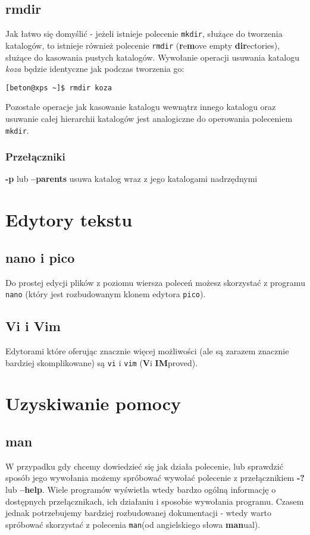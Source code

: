 \documentclass[10 pt, a4paper, draft]{report}
\begin{document}
\subsection{rmdir}
Jak łatwo się domyślić - jeżeli istnieje polecenie \texttt{mkdir}, służące do tworzenia katalogów, to istnieje również polecenie \texttt{rmdir} (\textbf{r}e\textbf{m}ove empty \textbf{dir}ectories), służące do kasowania pustych katalogów. Wywołanie operacji usuwania katalogu \textit{koza} będzie identyczne jak podczas tworzenia go:
\begin{verbatim}
[beton@xps ~]$ rmdir koza
\end{verbatim}
Pozostałe operacje jak kasowanie katalogu wewnątrz innego katalogu oraz usuwanie całej hierarchii katalogów jest analogiczne do operowania poleceniem \texttt{mkdir}.
\newline
\subsubsection*{Przełączniki}
\begin{description}
\item \textbf{-p} lub \textbf{--parents} usuwa katalog wraz z jego katalogami nadrzędnymi
\end{description}

\section{Edytory tekstu}
\subsection{nano i pico}
Do prostej edycji plików z poziomu wiersza poleceń możesz skorzystać z programu \texttt{nano} (który jest rozbudowanym klonem edytora \texttt{pico}).
\subsection{Vi i Vim}
Edytorami które oferując znacznie więcej możliwości (ale są zarazem znacznie bardziej skomplikowane) są \texttt{vi} i \texttt{vim} (\textbf{V}i \textbf{IM}proved).

\section{Uzyskiwanie pomocy}
\subsection{man}
W przypadku gdy chcemy dowiedzieć się jak działa polecenie, lub sprawdzić sposób jego wywołania możemy spróbować wywołać polecenie z przełącznikiem \textbf{-?} lub \textbf{--help}. Wiele programów wyświetla wtedy bardzo ogólną informację o dostępnych przełącznikach, ich działaniu i sposobie wywołania programu. Czasem jednak potrzebujemy bardziej rozbudowanej dokumentacji - wtedy warto spróbować skorzystać z polecenia \texttt{man}(od angielskiego słowa \textbf{man}ual).
\end{document}
